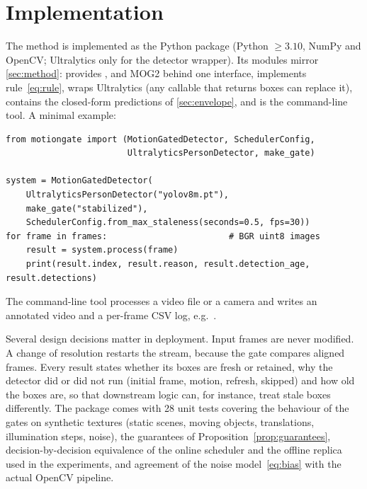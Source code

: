 \section{Implementation}\label{sec:implementation}

The method is implemented as the Python package  (Python $\ge3.10$, NumPy and OpenCV; Ultralytics only for the detector wrapper). Its modules mirror \cref{sec:method}:  provides \FD, \FDS{} and MOG2 behind one interface,  implements rule~\eqref{eq:rule},  wraps Ultralytics (any callable that returns boxes can replace it),  contains the closed-form predictions of \cref{sec:envelope}, and  is the command-line tool. A minimal example:

\begin{lstlisting}
from motiongate import (MotionGatedDetector, SchedulerConfig,
                        UltralyticsPersonDetector, make_gate)

system = MotionGatedDetector(
    UltralyticsPersonDetector("yolov8m.pt"),
    make_gate("stabilized"),
    SchedulerConfig.from_max_staleness(seconds=0.5, fps=30))
for frame in frames:                        # BGR uint8 images
    result = system.process(frame)
    print(result.index, result.reason, result.detection_age, result.detections)
\end{lstlisting}

\noindent The command-line tool processes a video file or a camera and writes an annotated video and a per-frame CSV log, e.g.\ .

Several design decisions matter in deployment. Input frames are never modified. A change of resolution restarts the stream, because the gate compares aligned frames. Every result states whether its boxes are fresh or retained, why the detector did or did not run (initial frame, motion, refresh, skipped) and how old the boxes are, so that downstream logic can, for instance, treat stale boxes differently. The package comes with 28 unit tests covering the behaviour of the gates on synthetic textures (static scenes, moving objects, translations, illumination steps, noise), the guarantees of Proposition~\ref{prop:guarantees}, decision-by-decision equivalence of the online scheduler and the offline replica used in the experiments, and agreement of the noise model~\eqref{eq:bias} with the actual OpenCV pipeline.
